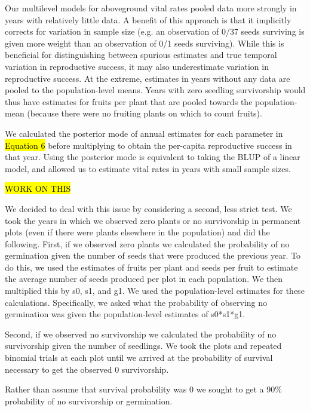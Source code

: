 \documentclass[12pt, oneside, titlepage]{article}   	%
\begin{document}
Our multilevel models for aboveground vital rates pooled data more strongly in years with relatively little data. A benefit of this approach is that it implicitly corrects for variation in sample size (e.g. an observation of 0/37 seeds surviving is given more weight than an observation of 0/1 seeds surviving). While this is beneficial for distinguishing between spurious estimates and true temporal variation in reproductive success, it may also underestimate variation in reproductive success. At the extreme, estimates in years without any data are pooled to the population-level means. Years with zero seedling survivorship would thus have estimates for fruits per plant that are pooled towards the population-mean (because there were no fruiting plants on which to count fruits). 

\iffalse

We calculated the posterior mode of annual estimates for each parameter in \hl{Equation 6} before multiplying to obtain the per-capita reproductive success in that year. Using the posterior mode is equivalent to taking the BLUP of a linear model, and allowed us to estimate vital rates in years with small sample sizes. 

\hl{WORK ON THIS}


We decided to deal with this issue by considering a second, less strict test. We took the years in which we observed zero plants or no survivorship in permanent plots (even if there were plants elsewhere in the population) and did the following. First, if we observed zero plants we calculated the probability of no germination given the number of seeds that were produced the previous year. To do this, we used the estimates of fruits per plant and seeds per fruit to estimate the average number of seeds produced per plot in each population. We then multiplied this by s0, s1, and g1. We used the population-level estimates for these calculations. Specifically, we asked what the probability of observing no germination was given the population-level estimates of s0*s1*g1.

Second, if we observed no survivorship we calculated the probability of no survivorship given the number of seedlings. We took the plots and repeated binomial trials at each plot until we arrived at the probability of survival necessary to get the observed 0 survivorship. 

Rather than assume that survival probability was 0 we sought to get a 90\% probability of no survivorship or germination. 
\end{document}
